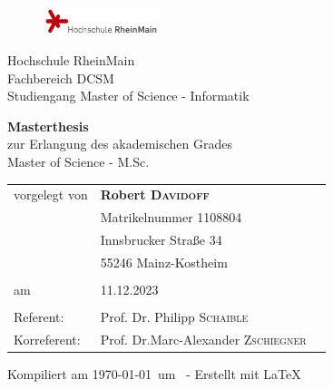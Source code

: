 \pagestyle{empty} %

\begin{figure}[t]
	\flushright
	\includegraphics[width=0.3\textwidth]{media/logo_hsrm}
\end{figure}


\begin{center}
Hochschule RheinMain \\
Fachbereich DCSM \\
Studiengang Master of Science - Informatik

\vspace{30 pt}

{\Large \textbf{Masterthesis}} \\
zur Erlangung des akademischen Grades \\ 
Master of Science - M.Sc.

\vspace{50 pt}

\begin{spacing}{1.2}
\LARGE \textbf{\thetitle}
\end{spacing}
%
\end{center}

\vfill %

%
\begin{small}
\begin{tabular}[h]{p{4cm}l l}
    vorgelegt von        & \textbf{Robert \textsc{Davidoff}} \\ 
                         & Matrikelnummer 1108804 \\
                         & Innsbrucker Straße 34 \\
                         & 55246 Mainz-Kostheim \\
                         & \\
    am                   & 11.12.2023 \\
                         & \\
    Referent:            & Prof. Dr. Philipp \textsc{Schaible}\\
    Korreferent:         & Prof. Dr.Marc-Alexander \textsc{Zschiegner}\\
\end{tabular}
%
\vspace{15pt}
%
\end{small}
%
\vspace{15pt}
%
\begin{center}
	\textcolor[gray]{0.4}{\tiny Kompiliert am \today ~um \currenttime ~- Erstellt mit \LaTeX}
\end{center}
%
\restoregeometry %
